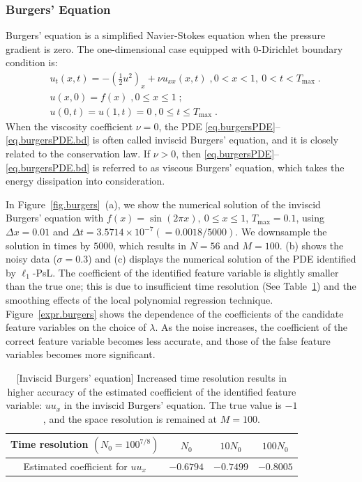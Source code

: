 \documentclass[a4paper,11pt]{article}
\begin{document}
\subsubsection{Burgers' Equation}
Burgers' equation is a simplified Navier-Stokes equation when the pressure gradient is zero. The one-dimensional case equipped with 0-Dirichlet boundary condition is:
\begin{align}
&u_t(x,t) = -(\frac{1}{2}u^2)_x+\nu u_{xx}(x,t)\;,0<x<1,~0<t<T_{\max}\;.\label{eq.burgersPDE}\\
&u(x,0)=f(x)\;, 0\leq x\leq 1\;;\label{eq.burgersPDE.ival}\\
&u(0,t)=u(1,t)=0\;,0\leq t\leq T_{\max}\label{eq.burgersPDE.bd}\;.
\end{align}
When the viscosity coefficient $\nu=0$, the PDE \eqref{eq.burgersPDE}--\eqref{eq.burgersPDE.bd} is often called inviscid Burgers' equation, and it is closely related to the conservation law. If $\nu>0$, then \eqref{eq.burgersPDE}--\eqref{eq.burgersPDE.bd} is referred to as viscous Burgers' equation, which takes the energy dissipation into consideration.

In Figure~\ref{fig.burgers}~(a), we show the numerical solution of the inviscid Burgers' equation with $f(x)=\sin(2\pi x),~0\leq x\leq 1$, $T_{\max}=0.1$, using $\Delta x = 0.01$ and $\Delta t=3.5714\times 10^{-7} (=0.0018/5000)$. We  downsample the solution in times by $5000$, which results in $N=56$ and $M=100$. (b) shows the noisy data ($\sigma=0.3$) and  (c) displays the numerical solution of the PDE identified by $\ell_1$-PsL. The coefficient of the identified feature variable is slightly smaller than the true one; this is due to insufficient time resolution (See Table~\ref{tab.coeff.burgers}) and the smoothing effects of the local polynomial regression technique. Figure~\ref{expr.burgers} shows the dependence of the coefficients of the candidate feature variables on the choice of $\lambda$. As the noise increases, the coefficient of the correct feature variable becomes less accurate, and those of the false feature variables becomes more significant.
\begin{table}
\centering
\begin{tabular}{c|c|c|c}
Time resolution $(N_0=100^{7/8})$&$N_0$&$10N_0$&$100N_0$\\\hline
Estimated coefficient for $uu_x$&$-0.6794$&$-0.7499$&$-0.8005$
\end{tabular}	
\caption{[Inviscid Burgers' equation] Increased time resolution results in higher accuracy of the estimated coefficient of the identified feature variable: $uu_x$ in the inviscid Burgers' equation. The true value is $-1$, and the space resolution is remained at $M=100$.}\label{tab.coeff.burgers}
\end{table}
\end{document}
